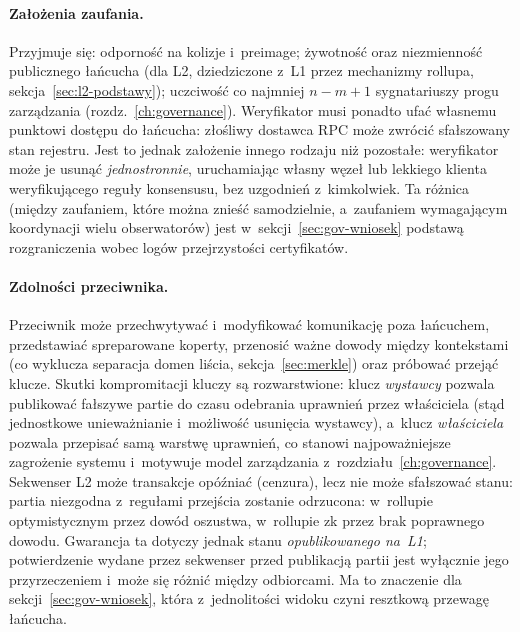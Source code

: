 \paragraph{Założenia zaufania.} Przyjmuje się: odporność  na
kolizje i~preimage; żywotność oraz niezmienność publicznego łańcucha (dla L2,
dziedziczone z~L1 przez mechanizmy rollupa, sekcja~\ref{sec:l2-podstawy});
uczciwość co najmniej $n-m+1$ sygnatariuszy progu zarządzania
(rozdz.~\ref{ch:governance}). Weryfikator musi ponadto ufać własnemu punktowi
dostępu do łańcucha: złośliwy dostawca RPC może zwrócić sfałszowany stan
rejestru. Jest to jednak założenie innego rodzaju niż pozostałe: weryfikator
może je usunąć \emph{jednostronnie}, uruchamiając własny węzeł lub lekkiego
klienta weryfikującego reguły konsensusu, bez uzgodnień z~kimkolwiek. Ta
różnica (między zaufaniem, które można znieść samodzielnie, a~zaufaniem
wymagającym koordynacji wielu obserwatorów) jest w~sekcji~\ref{sec:gov-wniosek}
podstawą rozgraniczenia wobec logów przejrzystości certyfikatów.

\paragraph{Zdolności przeciwnika.} Przeciwnik może przechwytywać i~modyfikować
komunikację poza łańcuchem, przedstawiać spreparowane koperty, przenosić ważne
dowody między kontekstami (co wyklucza separacja domen liścia,
sekcja~\ref{sec:merkle}) oraz próbować przejąć klucze. Skutki kompromitacji
kluczy są rozwarstwione: klucz \emph{wystawcy} pozwala publikować fałszywe
partie do czasu odebrania uprawnień przez właściciela (stąd jednostkowe
unieważnianie i~możliwość usunięcia wystawcy), a~klucz \emph{właściciela}
pozwala przepisać samą warstwę uprawnień, co stanowi najpoważniejsze zagrożenie
systemu i~motywuje model zarządzania z~rozdziału~\ref{ch:governance}. Sekwenser
L2 może transakcje opóźniać (cenzura), lecz nie może sfałszować stanu:
partia niezgodna z~regułami przejścia zostanie odrzucona: w~rollupie
optymistycznym przez dowód oszustwa, w~rollupie zk przez brak poprawnego dowodu.
Gwarancja ta dotyczy jednak stanu \emph{opublikowanego na~L1}; potwierdzenie
wydane przez sekwenser przed publikacją partii jest wyłącznie jego przyrzeczeniem
i~może się różnić między odbiorcami. Ma to znaczenie dla
sekcji~\ref{sec:gov-wniosek}, która z~jednolitości widoku czyni resztkową
przewagę łańcucha.

